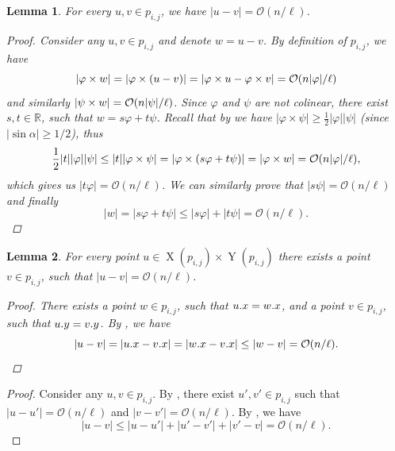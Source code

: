 \documentclass[11pt, letterpaper]{article}
\theoremstyle{plain}
\newtheorem{lemma}{Lemma}
\theoremstyle{definition}
\theoremstyle{remark}
\renewcommand{\O}{\mathcal{O}}
\renewcommand{\phi}{\varphi}
\DeclareMathOperator*{\X}{X}
\DeclareMathOperator*{\Y}{Y}
\begin{document}
\begin{lemma}\label{distance_bound_aux}
	For every $u, v \in p_{i, j}$, we have $|u - v| = \O(n / \ell)$.
	\begin{proof}
		Consider any $u, v \in p_{i, j}$ and denote $w = u - v$.
		By definition of $p_{i, j}$, we have
		\[ |\h{w}| = |\h{(u - v)}| = |\h{u} - \h{v}| = \O(n|\phi| / \ell) \]
		and similarly $|\s{w}| = \O(n|\psi| / \ell)$.
		Since $\phi$ and $\psi$ are not colinear, there exist $s, t \in \mathbb{R}$, such that $w = s\phi + t\psi$.
		Recall that by  we have $|\phi \times \psi| \ge \frac{1}{2}|\phi||\psi|$ (since $|\sin \alpha| \ge 1/2$), thus
		\[ \frac{1}{2}|t||\phi||\psi| \le |t||\phi \times \psi| = |\phi \times (s\phi + t\psi)| = |\h{w}| = \O(n|\phi| / \ell), \]
		which gives us $|t\phi| = \O(n / \ell)$.
		We can similarly prove that $|s\psi| = \O(n / \ell)$ and finally
		\[ |w| = |s\phi + t\psi| \le |s\phi| + |t\psi| = \O(n / \ell). \]
	\end{proof}
\end{lemma}

\begin{lemma}\label{distance_bound_aux2}
	For every point $u \in \X(p_{i, j}) \times \Y(p_{i, j})$ there exists a point $v \in p_{i, j}$, such that $|u - v| = \O(n / \ell)$.
	\begin{proof}
		There exists a point $w \in p_{i, j}$, such that $u.x = w.x$, and a point $v \in p_{i, j}$, such that $u.y = v.y$.
		By , we have
		\[|u - v| = |\x{u} - \x{v}| = |\x{w} - \x{v}| \le |w - v| = \O(n / \ell).\] 
	\end{proof}
\end{lemma}

\DistanceBoundLemma
\begin{proof}
	Consider any $u, v \in p_{i, j}$.
	By , there exist $u', v' \in p_{i, j}$ such that $|u - u'| = \O(n / \ell)$ and $|v - v'| = \O(n / \ell)$.
	By , we have
	\[ |u - v| \le |u - u'| + |u' - v'| + |v' - v| = \O(n / \ell). \]
\end{proof}



\end{document}
